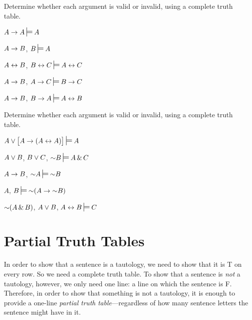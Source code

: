 \noindent\problempart
\label{pr.TT.valid}
Determine whether each argument is valid or invalid, using a complete truth table. 
\begin{earg}
\item $A\eif A \sdtstile{}{} A$ \vspace{.5ex}%

\item $A\rightarrow B$, $B \sdtstile{}{} A$ %

\item $A\leftrightarrow B$, $B\eiff C \sdtstile{}{}A\eiff C$ %

\item $A \rightarrow B$, $A \eif C\sdtstile{}{}B \eif C$ %

\item $A \rightarrow B$, $B \eif A\sdtstile{}{}A \eiff B$ %

\end{earg}

\noindent\problempart
\label{pr.TT.valid}
Determine whether each argument is valid or invalid, using a complete truth table. 
\begin{earg}
\item $A\eor\bigl[A\eif(A\eiff A)\bigr] \sdtstile{}{} A $\vspace{.5ex}%
\item $A\vee B$, $B\vee C$, $\enot B \sdtstile{}{}A \eand C$\vspace{.5ex} %
\item $A \rightarrow B$, $\enot A\sdtstile{}{}\enot B$ \vspace{.5ex}%
\item $A$, $B\sdtstile{}{}\enot(A\eif \enot B)$ \vspace{.5ex}%
\item $\mathord{\sim}(A \,\&\, B)$, $A \vee B$, $A \eiff B\sdtstile{}{}C$ \vspace{.5ex}%
\end{earg}


\section{Partial Truth Tables}
\setlength{\parindent}{1em}
In order to show that a sentence is a tautology, we need to show that it is T on every row. So we need a complete truth table. To show that a sentence is \emph{not} a tautology, however, we only need one line: a line on which the sentence is F. Therefore, in order to show that something is not a tautology, it is enough to provide a one-line \emph{partial truth table}---regardless of how many sentence letters the sentence might have in it.

